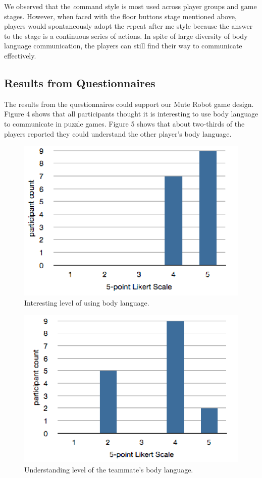 \documentclass{chi-ext}
\begin{document}
We observed that the {\emph command style} is most used across player groups and game stages. 
However, when faced with the floor buttons stage mentioned above, players would spontaneously adopt the {\emph repeat after me} style because the answer to the stage is a continuous series of actions.
In spite of large diversity of body language communication, the players can still find their way to communicate effectively.


%
\subsection{Results from Questionnaires}

The results from the questionnaires could support our Mute Robot game design. 
Figure 4 shows that all participants thought it is interesting to use body language to communicate in puzzle games.
Figure 5 shows that about two-thirds of the players reported they could understand the other player's body language.

\begin{figure}
  \centering
  \includegraphics[width=0.65\linewidth]{figures/1_BLisInteresting.png}
  \caption{Interesting level of using body language.}
  \label{fig:1_BLisInteresting}
\end{figure}


\begin{figure}
  \centering
  \includegraphics[width=0.65\linewidth]{figures/2_BLunderstand.png}
  \caption{Understanding level of the teammate's body language.}
  \label{fig:2_BLunderstand}
\end{figure}
\end{document}
